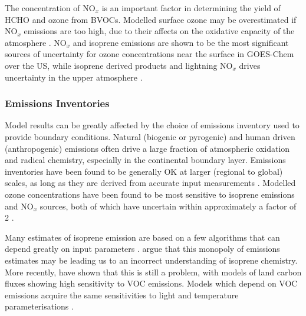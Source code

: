     The concentration of NO$_x$ is an important factor in determining the yield of HCHO and ozone from BVOCs.
    Modelled surface ozone may be overestimated if NO$_x$ emissions are too high, due to their affects on the oxidative capacity of the atmosphere \parencite{Travis2016}.
    NO$_x$ and isoprene emissions are shown to be the most significant sources of uncertainty for ozone concentrations near the surface in GOES-Chem over the US, while isoprene derived products and lightning NO$_x$ drives uncertainty in the upper atmosphere \parencite{Christian2017}.
    
    \subsubsection{Emissions Inventories}
      Model results can be greatly affected by the choice of emissions inventory used to provide boundary conditions.
      Natural (biogenic or pyrogenic) and human driven (anthropogenic) emissions often drive a large fraction of atmospheric oxidation and radical chemistry, especially in the continental boundary layer.
      Emissions inventories have been found to be generally OK at larger (regional to global) scales, as long as they are derived from accurate input measurements \parencite{Zeng2015}.
      Modelled ozone concentrations have been found to be most sensitive to isoprene emissions and NO$_x$ sources, both of which have uncertain within approximately a factor of 2 \parencite{Christian2017}.
      
      Many estimates of isoprene emission are based on a few algorithms that can depend greatly on input parameters \parencite{Arneth2008,Niinemets2010}.
      \textcite{Arneth2008} argue that this monopoly of emissions estimates may be leading us to an incorrect understanding of isoprene chemistry.
      More recently, \textcite{Yue2015} have shown that this is still a problem, with models of land carbon fluxes showing high sensitivity to VOC emissions.
      Models which depend on VOC emissions acquire the same sensitivities to light and temperature parameterisations \parencite{Yue2015}.
      
